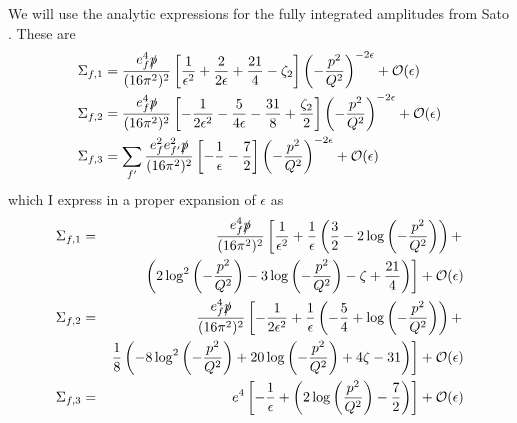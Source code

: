 \documentclass[11pt]{article}
\begin{document}
We will use the analytic expressions for the fully integrated amplitudes from Sato \cite{Sato2013}.  These are
\begin{align}
\Sigma_{f,1} &= \frac{e_f^4\slashed{p}}{(16\pi^2)^2} \left[ \frac{1}{\epsilon^2}+\frac{2}{2\epsilon} +\frac{21}{4}-\zeta_2  \right]\left(-\frac{p^2}{Q^2}\right)^{-2\epsilon} + \mathcal{O}(\epsilon)\\
\Sigma_{f,2} &= \frac{e_f^4\slashed{p}}{(16\pi^2)^2} \left[- \frac{1}{2\epsilon^2}-\frac{5}{4\epsilon} -\frac{31}{8}+\frac{\zeta_2}{2} \right]\left(-\frac{p^2}{Q^2}\right)^{-2\epsilon} + \mathcal{O}(\epsilon)\\
\Sigma_{f,3} &= \sum_{f'}\frac{e_f^2e_{f'}^2\slashed{p}}{(16\pi^2)^2} \left[ -\frac{1}{\epsilon} -\frac{7}{2} \right]\left(-\frac{p^2}{Q^2}\right)^{-2\epsilon} + \mathcal{O}(\epsilon)
\end{align}
which I express in a proper expansion of $\epsilon$ as
\begin{eqnarray}
&\Sigma_{f,1} = & \frac{e_f^4\slashed{p}}{(16\pi^2)^2} \left[ 
\frac{1}{\epsilon^2}+\frac{1}{\epsilon} \left( \frac{3}{2} - 2 \log\left(-\frac{p^2}{Q^2}\right)\right) + \right.\\
&&\left.   \left(2\log^2\left(-\frac{p^2}{Q^2}\right)  -3 \log\left(-\frac{p^2}{Q^2}\right)-\zeta+\frac{21}{4}\right) \right]
+ \mathcal{O}(\epsilon)\nonumber\\\label{eqn:Sato_SE2}
&\Sigma_{f,2} = & \frac{e_f^4\slashed{p}}{(16\pi^2)^2} \left[
- \frac{1}{2\epsilon^2}+\frac{1}{\epsilon} \left(-\frac{5}{4} + \log\left(-\frac{p^2}{Q^2}\right)\right) + \right.\\ 
&&\left.   \frac{1}{8} \left(-8\log^2\left(-\frac{p^2}{Q^2}\right)  + 20\log\left(-\frac{p^2}{Q^2}\right)+4\zeta-31\right)
 \right] + \mathcal{O}(\epsilon)\nonumber\\ \label{eqn:Sato_SE3}
&\Sigma_{f,3} = &e^4 \left[ -\frac{1}{\epsilon} + \left( 2 \log\left(\frac{p^2}{Q^2}\right)-\frac{7}{2} \right) \right] + \mathcal{O}(\epsilon)
\end{eqnarray}
\end{document}
